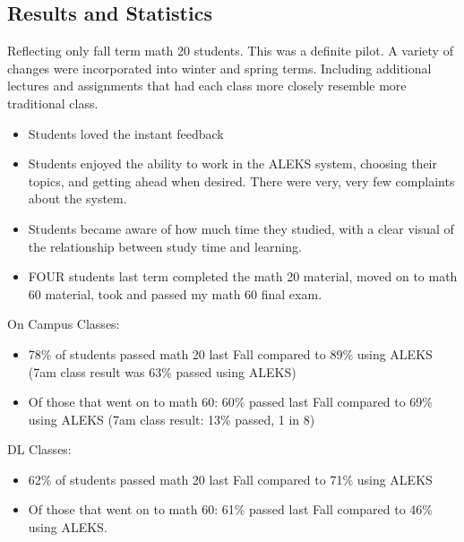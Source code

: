 \subsection{Results and Statistics}
Reflecting only fall term math 20 students.  This was a definite pilot.  A variety of changes were incorporated into winter and spring terms.  Including additional lectures and assignments that had each class more closely resemble more traditional class.
\begin{itemize}
	\item Students loved the instant feedback
	\item Students enjoyed the ability to work in the ALEKS system, choosing their topics, and getting ahead when desired.  There were very, very few complaints about the system.
	\item Students became aware of how much time they studied, with a clear visual of the relationship between study time and learning. 
	\item FOUR students last term completed the math 20 material, moved on to math 60 material, took and passed my math 60 final exam.
\end{itemize}

On Campus Classes:  
\begin{itemize}
	\item 78\% of students passed math 20 last Fall compared to 89\% using ALEKS  (7am class result was 63\% passed using ALEKS)
	\item Of those that went on to math 60:  60\% passed last Fall compared to 69\% using ALEKS (7am class result: 13\% passed, 1 in 8)
\end{itemize}
DL Classes:
\begin{itemize}
	\item 62\% of students passed math 20 last Fall compared to 71\% using ALEKS
	\item Of those that went on to math 60:  61\% passed last Fall compared to 46\% using ALEKS.  
\end{itemize}

